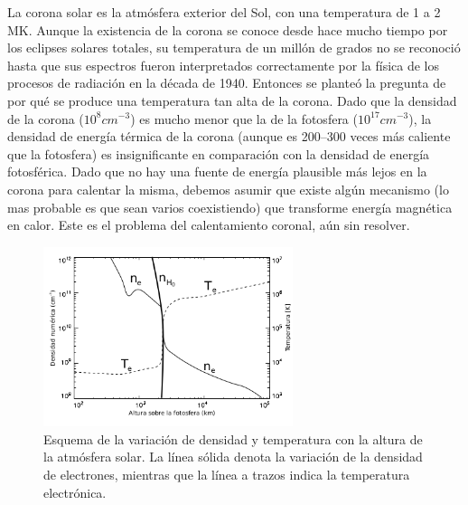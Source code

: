 \documentclass[a4paper,11pt]{report}
\def\fig#1{Figura \ref{#1}}
\begin{document}

La corona solar es la atmósfera exterior del Sol, con una temperatura de 1 a 2 MK. Aunque la existencia de la corona se conoce desde hace mucho tiempo por los eclipses solares totales, su temperatura de un millón de grados no se reconoció hasta que sus espectros fueron interpretados correctamente por la física de los procesos de radiación en la década de 1940. Entonces se planteó la pregunta de por qué se produce una temperatura tan alta de la corona. Dado que la densidad de la corona ($10^{8} cm^{-3}$) es mucho menor que la de la fotosfera ($10^{17} cm^{-3}$), la densidad de energía térmica de la corona (aunque es 200–300 veces más caliente que la fotosfera) es insignificante en comparación con la densidad de energía fotosférica. 
Dado que no hay una fuente de energía plausible más lejos en la corona para calentar la misma, debemos asumir que existe algún mecanismo (lo mas probable es que sean varios coexistiendo) que transforme energía magnética en calor. Este es el problema del calentamiento coronal, aún sin resolver.

\begin{figure}[ht]
\begin{center}
\includegraphics[width=0.65\textwidth]{figuras/calentamiento.png}
\end{center}
\caption{Esquema de la variación de densidad y temperatura con la altura de la atmósfera solar. La línea sólida denota la variación de la densidad de electrones, mientras que la línea a trazos indica la temperatura electrónica.}
\label{calentamiento}
\end{figure}
\end{document}
